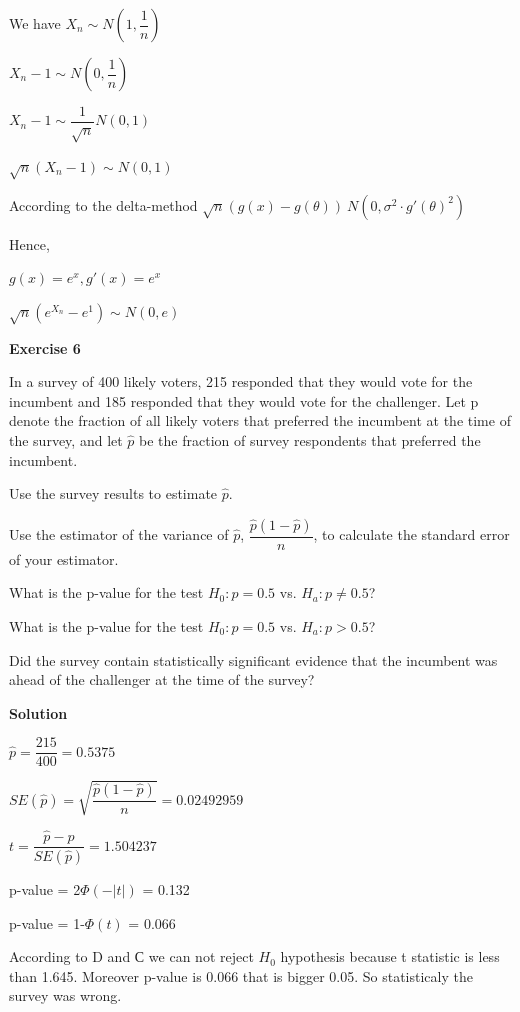 \documentclass[12pt]{article}
\begin{document}
We have $X_n \sim N\left(1, \dfrac{1}{n}\right)$

$X_n-1 \sim N\left(0, \dfrac{1}{n}\right)$

$X_n-1 \sim \dfrac{1}{\sqrt{n}} N\left(0, 1\right)$

$\sqrt{n}\left(X_n-1\right) \sim N\left(0, 1\right)$

According to the delta-method $\sqrt{n}\left(g\left(x\right)-g\left(\theta\right)\right)~N\left(0, \sigma^2 \cdot g'\left(\theta\right)^2\right)$

Hence,

$g\left(x\right)=e^x, g'\left(x\right)=e^x$

$\sqrt{n}(e^{X_n} - e^{1})\sim N\left(0, e\right)$

\bigskip 

\textbf{Exercise 6}

In a survey of 400 likely voters, 215 responded that they would vote for the incumbent and 185 responded that they would vote for the challenger. Let p denote the fraction of all likely voters that preferred the incumbent at the time of the survey, and let $\hat{p}$ be the fraction of survey respondents that preferred the incumbent.

\begin{list}{()~}{}
\item Use the survey results to estimate $\hat{p}$.
\item Use the estimator of the variance of $\hat{p}$, $\dfrac{\hat{p}\left(1-\hat{p}\right)}{n}$, to calculate the standard error of your estimator.
\item What is the p-value for the test $H_0: p = 0.5$ vs. $H_a: p \neq 0.5$?
\item What is the p-value for the test $H_0: p = 0.5$ vs. $H_a: p > 0.5$?
\item Did the survey contain statistically significant evidence that the incumbent was ahead of the challenger at the time of the survey?
\end{list}

\medskip

\textbf{Solution}

\begin{list}{()~}{}
\item 
$\hat{p}=\dfrac{215}{400} = 0.5375$
\item
$SE(\hat{p})=\sqrt{\dfrac{\hat{p}(1 - \hat{p})}{n}} = 0.02492959$
\item
$t = \dfrac{\hat{p}-p}{SE(\hat{p})}=1.504237$

p-value = 2$\Phi(-|t|)$ = 0.132
\item
p-value = 1-$\Phi(t)$ = 0.066
\item
According to D and С we can not reject $H_0$ hypothesis because t statistic is less than 1.645. Moreover p-value is 0.066 that is bigger 0.05. So statisticaly the survey was wrong.
\end{list}
\end{document}

